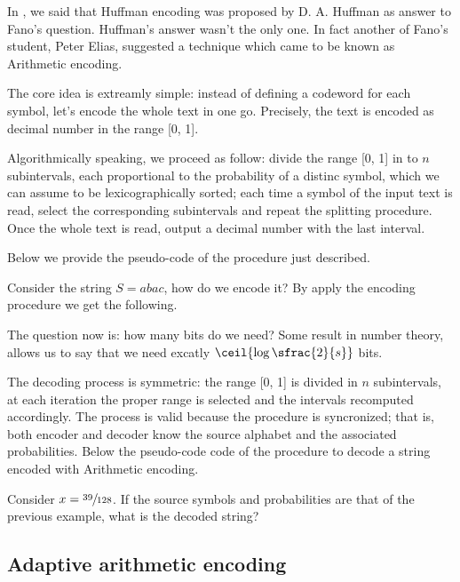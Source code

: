 \documentclass{subfiles}
\begin{document}
\label{sec:arithmeticEncoding}
    In , we said that Huffman encoding was proposed by D. A. Huffman 
        as answer to Fano's question. Huffman's answer wasn't the only one. 
        In fact another of Fano's student, Peter Elias,
        suggested a technique which came to be known as Arithmetic encoding.

    The core idea is extreamly simple: instead of defining a codeword for each 
        symbol, let's encode the whole text in one go. Precisely, 
        the text is encoded as decimal number in the range [0, 1].
    
    Algorithmically speaking, we proceed as follow: divide the range [0, 1]
        in to \(n\) subintervals, each proportional to the probability of a distinc symbol,
        which we can assume to be lexicographically sorted; each time a symbol 
        of the input text is read, select the corresponding subintervals and 
        repeat the splitting procedure. Once the whole text is read, 
        output a decimal number with the last interval.

    Below we provide the pseudo-code of the procedure just described.
    

    \begin{example*}
        Consider the string \(S = abac\), how do we encode it? 
            By apply the encoding procedure we get the following.

            
    \end{example*}

    The question now is: how many bits do we need? Some result in number theory,
        allows us to say that we need excatly \(\ceil{\log\sfrac{2}{s}}\) bits.

    The decoding process is symmetric: the range [0, 1] is divided in \(n\)
        subintervals, at each iteration the proper range is selected and 
        the intervals recomputed accordingly. The process is valid 
        because the procedure is syncronized; that is,
        both encoder and decoder know the source alphabet and the associated probabilities.
        Below the pseudo-code code of the procedure to decode a string encoded with Arithmetic encoding.

    
    \begin{example*}
        Consider \(x = \sfrac{39}{128}\). If the source symbols and probabilities 
            are that of the previous example, what is the decoded string?

            
    \end{example*}

    \subsection{Adaptive arithmetic encoding}
    
\end{document}
